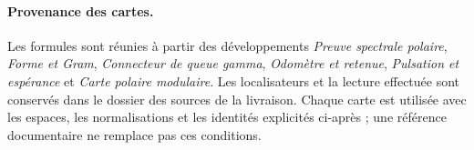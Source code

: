 \paragraph{Provenance des cartes.}
Les formules sont réunies à partir des développements \emph{Preuve spectrale polaire}, \emph{Forme et Gram}, \emph{Connecteur de queue gamma}, \emph{Odomètre et retenue}, \emph{Pulsation et espérance} et \emph{Carte polaire modulaire}. Les localisateurs et la lecture effectuée sont conservés dans le dossier des sources de la livraison. Chaque carte est utilisée avec les espaces, les normalisations et les identités explicités ci-après ; une référence documentaire ne remplace pas ces conditions.

